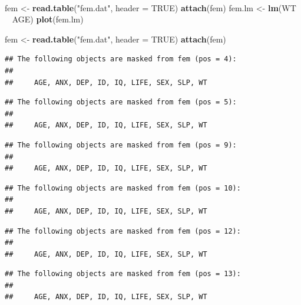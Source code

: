 \documentclass[12pt,a4paper]{book}
\newenvironment{Shaded}{\begin{snugshade}}{\end{snugshade}}
\newcommand{\KeywordTok}[1]{\textcolor[rgb]{0.13,0.29,0.53}{\textbf{#1}}}
\newcommand{\DataTypeTok}[1]{\textcolor[rgb]{0.13,0.29,0.53}{#1}}
\newcommand{\StringTok}[1]{\textcolor[rgb]{0.31,0.60,0.02}{#1}}
\newcommand{\OtherTok}[1]{\textcolor[rgb]{0.56,0.35,0.01}{#1}}
\newcommand{\OperatorTok}[1]{\textcolor[rgb]{0.81,0.36,0.00}{\textbf{#1}}}
\newcommand{\NormalTok}[1]{#1}
\theoremstyle{definition}
\theoremstyle{definition}
\theoremstyle{definition}
\theoremstyle{remark}
\begin{document}
~

\begin{Shaded}
\begin{Highlighting}[]
\NormalTok{fem <-}\StringTok{ }\KeywordTok{read.table}\NormalTok{(}\StringTok{"fem.dat"}\NormalTok{, }\DataTypeTok{header =} \OtherTok{TRUE}\NormalTok{)}
\KeywordTok{attach}\NormalTok{(fem)}
\NormalTok{fem.lm <-}\StringTok{ }\KeywordTok{lm}\NormalTok{(WT }\OperatorTok{~}\StringTok{ }\NormalTok{AGE)}
\KeywordTok{plot}\NormalTok{(fem.lm)}
\end{Highlighting}
\end{Shaded}

\begin{Shaded}
\begin{Highlighting}[]
\NormalTok{fem <-}\StringTok{ }\KeywordTok{read.table}\NormalTok{(}\StringTok{"fem.dat"}\NormalTok{, }\DataTypeTok{header =} \OtherTok{TRUE}\NormalTok{)}
\KeywordTok{attach}\NormalTok{(fem)}
\end{Highlighting}
\end{Shaded}

\begin{verbatim}
## The following objects are masked from fem (pos = 4):
## 
##     AGE, ANX, DEP, ID, IQ, LIFE, SEX, SLP, WT
\end{verbatim}

\begin{verbatim}
## The following objects are masked from fem (pos = 5):
## 
##     AGE, ANX, DEP, ID, IQ, LIFE, SEX, SLP, WT
\end{verbatim}

\begin{verbatim}
## The following objects are masked from fem (pos = 9):
## 
##     AGE, ANX, DEP, ID, IQ, LIFE, SEX, SLP, WT
\end{verbatim}

\begin{verbatim}
## The following objects are masked from fem (pos = 10):
## 
##     AGE, ANX, DEP, ID, IQ, LIFE, SEX, SLP, WT
\end{verbatim}

\begin{verbatim}
## The following objects are masked from fem (pos = 12):
## 
##     AGE, ANX, DEP, ID, IQ, LIFE, SEX, SLP, WT
\end{verbatim}

\begin{verbatim}
## The following objects are masked from fem (pos = 13):
## 
##     AGE, ANX, DEP, ID, IQ, LIFE, SEX, SLP, WT
\end{verbatim}
\end{document}
